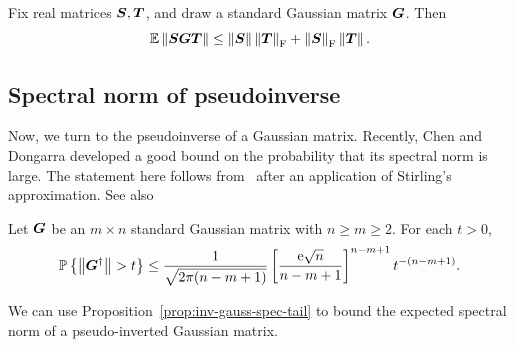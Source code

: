 \documentclass[final]{siamltex}
\newtheorem{remark}{Remark}[section]
\begin{document}
\begin{appendix}
\lsp

\begin{proposition} \label{prop:gauss-spec-expect}
Fix real matrices $\bm{S}, \bm{T}$, and draw a standard Gaussian matrix $\bm{G}$.  Then
$$
\operatorname{\mathbb{E}} \left\Vert { \bm{SGT} } \right\Vert
    \leq \left\Vert {\bm{S}} \right\Vert \left\Vert {\bm{T}} \right\Vert_{\mathrm{F}} + \left\Vert {\bm{S}} \right\Vert_{\mathrm{F}} \left\Vert {\bm{T}} \right\Vert.
$$
\end{proposition}




\subsection{Spectral norm of pseudoinverse}

Now, we turn to the pseudoinverse of a Gaussian matrix.
Recently, Chen and Dongarra developed a good bound on the
probability that its spectral norm is large.  The statement
here follows from~\cite[Lem.~4.1]{CD05:Condition-Numbers}
after an application of Stirling's approximation. %
See also~\cite[Lem.~2.14]{random1}

\lsp

\begin{proposition} \label{prop:inv-gauss-spec-tail}
Let $\bm{G}$ be an $m \times n$ standard Gaussian matrix with $n \geq m \geq 2$.
For each $t > 0$,
\begin{equation*} \label{eqn:gauss-lower-bd-2}
\Prob{ \smnorm{}{\mtx{G}^\psinv} > t }
    \leq \frac{1}{\sqrt{2\pi(n-m+1)}} \left[ \frac{\econst\sqrt{n}}{n-m+1}\right]^{n-m+1} t^{-(n-m+1)}.
\end{equation*}
\end{proposition}


We can use Proposition~\ref{prop:inv-gauss-spec-tail} to bound
the expected spectral norm of a pseudo-inverted
Gaussian matrix.


\end{appendix}
\end{document}
